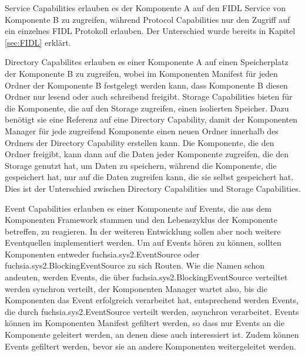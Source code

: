 \documentclass[a4paper]{scrartcl}
\begin{document}
Service Capabilities erlauben es der Komponente A auf den FIDL Service von Komponente B zu zugreifen, während Protocol Capabilities nur den Zugriff auf ein einzelnes FIDL Protokoll erlauben. Der Unterschied wurde bereits in Kapitel \ref{sec:FIDL} erklärt.

Directory Capabilites erlauben es einer Komponente A auf einen Speicherplatz der Komponente B zu zugreifen, wobei im Komponenten Manifest für jeden Ordner der Komponente B festgelegt werden kann, dass Komponente B diesen Ordner nur lesend oder auch schreibend freigibt. Storage Capabilities bieten für die Komponente, die auf den Storage zugreifen, einen isolierten Speicher. Dazu benötigt sie eine Referenz auf eine Directory Capability, damit der Komponenten Manager für jede zugreifend Komponente einen neuen Ordner innerhalb des Ordners der Directory Capability erstellen kann. Die Komponente, die den Ordner freigibt, kann dann auf die Daten jeder Komponente zugreifen, die den Storage genutzt hat, um Daten zu speichern, während die Komponente, die gespeichert hat, nur auf die Daten zugreifen kann, die sie selbst gespeichert hat. Dies ist der Unterschied zwischen Directory Capabilities und Storage Capabilities.

Event Capabilities erlauben es einer Komponente auf Events, die aus dem Komponenten Framework stammen und den Lebenszyklus der Komponente betreffen, zu reagieren. In der weiteren Entwicklung sollen aber noch weitere Eventquellen implementiert werden.  Um auf Events hören zu können, sollten Komponenten entweder fuchsia.sys2.EventSource oder fuchsia.sys2.BlockingEventSource zu sich Routen. Wie die Namen schon andeuten, werden Events, die über fuchsia.sys2.BlockingEventSource verteiltet werden synchron verteilt, der Komponenten Manager wartet also, bis die Komponenten das Event erfolgreich verarbeitet hat, entsprechend werden Events, die durch fuchsia.sys2.EventSource verteilt werden, asynchron verarbeitet. Events können im Komponenten Manifest gefiltert werden, so dass nur Events an die Komponente geleitert werden, an denen diese auch interessiert ist. Zudem können Events gefiltert werden, bevor sie an andere Komponenten weitergeleitet werden. \cite{Fuchsia.Component.Events}
\end{document}

